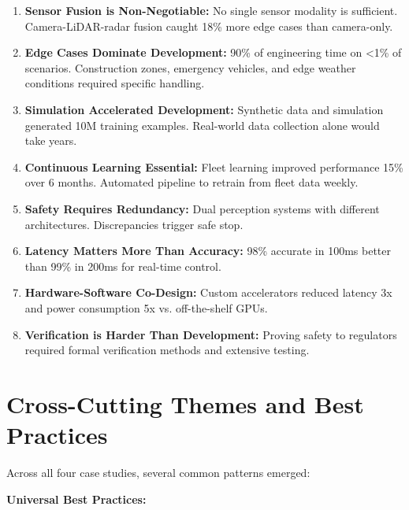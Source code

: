 \begin{enumerate}
    \item \textbf{Sensor Fusion is Non-Negotiable:} No single sensor modality is sufficient. Camera-LiDAR-radar fusion caught 18\% more edge cases than camera-only.

    \item \textbf{Edge Cases Dominate Development:} 90\% of engineering time on <1\% of scenarios. Construction zones, emergency vehicles, and edge weather conditions required specific handling.

    \item \textbf{Simulation Accelerated Development:} Synthetic data and simulation generated 10M training examples. Real-world data collection alone would take years.

    \item \textbf{Continuous Learning Essential:} Fleet learning improved performance 15\% over 6 months. Automated pipeline to retrain from fleet data weekly.

    \item \textbf{Safety Requires Redundancy:} Dual perception systems with different architectures. Discrepancies trigger safe stop.

    \item \textbf{Latency Matters More Than Accuracy:} 98\% accurate in 100ms better than 99\% in 200ms for real-time control.

    \item \textbf{Hardware-Software Co-Design:} Custom accelerators reduced latency 3x and power consumption 5x vs. off-the-shelf GPUs.

    \item \textbf{Verification is Harder Than Development:} Proving safety to regulators required formal verification methods and extensive testing.
\end{enumerate}

\section{Cross-Cutting Themes and Best Practices}

Across all four case studies, several common patterns emerged:

\textbf{Universal Best Practices:}

